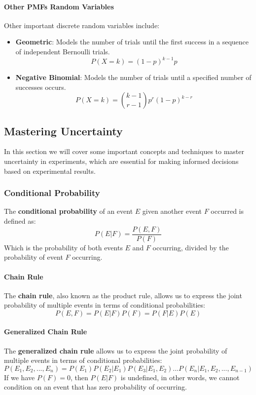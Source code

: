 \paragraph{Other PMFs Random Variables}
Other important discrete random variables include:
\begin{itemize}
    \item \textbf{Geometric}: Models the number of trials until the first success in a sequence of independent Bernoulli trials.
    \[ P(X=k) = (1-p)^{k-1} p \]
    \item \textbf{Negative Binomial}: Models the number of trials until a specified number of successes occurs.
    \[ P(X=k) = \binom{k-1}{r-1} p^r (1-p)^{k-r} \]
\end{itemize}

\subsection{Mastering Uncertainty}
In this section we will cover some important concepts and techniques to master uncertainty in experiments, 
which are essential for making informed decisions based on experimental results.

\subsubsection{Conditional Probability}
The \textbf{conditional probability} of an event $E$ given another event $F$ occurred is defined as:
\begin{equation}
    P(E|F) = \frac{P(E,F)}{P(F)}
\end{equation}
Which is the probability of both events $E$ and $F$ occurring, divided by the probability of event $F$ occurring.

\paragraph{Chain Rule}
The \textbf{chain rule}, also known as the product rule, allows us to express the joint probability of multiple events in terms of conditional probabilities:
\begin{equation}
    P(E,F) = P(E|F) P(F) = P(F|E) P(E)
\end{equation}

\paragraph{Generalized Chain Rule}
The \textbf{generalized chain rule} allows us to express the joint probability of multiple events in terms of conditional probabilities:
\begin{equation}
    P(E_1, E_2, ..., E_n) = P(E_1) P(E_2|E_1) P(E_3|E_1, E_2) ... P(E_n|E_1, E_2, ..., E_{n-1})
\end{equation}
If we have $P(F)=0$, then $P(E|F)$ is undefined, in other words, we cannot condition on an event that has zero probability of occurring.

